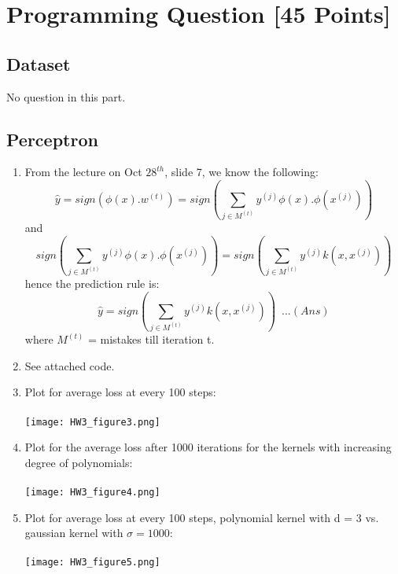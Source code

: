 \documentclass[letterpaper]{article}
\begin{document}
	\section{Programming Question [45 Points]}
	
	\subsection{Dataset}
	No question in this part.
	
	\subsection{Perceptron}
	\begin{enumerate}
		
		\item
		From the lecture on Oct $28^{th}$, slide 7, we know the following:
		\begin{equation}
			\hat{y} = sign(\phi(x).w^{(t)}) = sign(\sum_{j \in M^{(t)}}{y^{(j)}\phi(x).\phi(x^{(j)})})
		\end{equation}
		and
		\begin{equation}
			sign(\sum_{j \in M^{(t)}}{y^{(j)}\phi(x).\phi(x^{(j)})}) = sign(\sum_{j \in M^{(t)}}{y^{(j)}k(x, x^{(j)})})
		\end{equation}
		hence the prediction rule is:
		\begin{equation}
			\hat{y} = sign(\sum_{j \in M^{(t)}}{y^{(j)}k(x, x^{(j)})}) \,\,\, ...(Ans)
		\end{equation}
		where $M^{(t)}$ = mistakes till iteration t.
		
		\item See attached code.
		
		\item Plot for average loss at every 100 steps:\\ \\
		\texttt{[image: HW3\_figure3.png]}
		
		\item Plot for the average loss after 1000 iterations for the kernels with increasing degree of polynomials:\\ \\ 
		\texttt{[image: HW3\_figure4.png]}
		
		\item Plot for average loss at every 100 steps, polynomial kernel with d = 3 vs. gaussian kernel with $\sigma = 1000$:\\  \\
		\texttt{[image: HW3\_figure5.png]}
		
	\end{enumerate}
	
\end{document}
